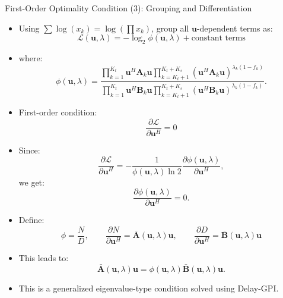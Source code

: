 \documentclass{beamer}
\begin{document}
\begin{frame}{First-Order Optimality Condition (3): Grouping and Differentiation}
\small

\begin{itemize}
    \item Using $\sum \log(x_k)=\log\left(\prod x_k\right)$, group all $\mathbf{u}$-dependent terms as:
    \[
        \mathcal{L}(\mathbf{u},\lambda)
        =
        -\log_2 \phi(\mathbf{u},\lambda)
        +
        \text{constant terms}
    \]

    \item where:
    \[
        \phi(\mathbf{u},\lambda)
        =
        \frac{
        \prod_{k=1}^{K_t}
        \mathbf{u}^H\mathbf{A}_k\mathbf{u}
        \prod_{k=K_t+1}^{K_t+K_s}
        (\mathbf{u}^H\mathbf{A}_k\mathbf{u})^{\lambda_k(1-f_k)}
        }
        {
        \prod_{k=1}^{K_t}
        \mathbf{u}^H\mathbf{B}_k\mathbf{u}
        \prod_{k=K_t+1}^{K_t+K_s}
        (\mathbf{u}^H\mathbf{B}_k\mathbf{u})^{\lambda_k(1-f_k)}
        } .
    \]

    \item First-order condition:
    \[
        \frac{\partial \mathcal{L}}{\partial \mathbf{u}^H}=0
    \]

    \item Since:
    \[
        \frac{\partial \mathcal{L}}{\partial \mathbf{u}^H}
        =
        -
        \frac{1}{\phi(\mathbf{u},\lambda)\ln 2}
        \frac{\partial \phi(\mathbf{u},\lambda)}
        {\partial \mathbf{u}^H},
    \]
    we get:
    \[
        \frac{\partial \phi(\mathbf{u},\lambda)}
        {\partial \mathbf{u}^H}=0 .
    \]

\end{itemize}
\end{frame}

\begin{frame}{}
\begin{itemize}
    \item Define:
    \[
        \phi = \frac{N}{D},
        \qquad
        \frac{\partial N}{\partial \mathbf{u}^H}
        =
        \bar{\mathbf{A}}(\mathbf{u},\lambda)\mathbf{u},
        \qquad
        \frac{\partial D}{\partial \mathbf{u}^H}
        =
        \bar{\mathbf{B}}(\mathbf{u},\lambda)\mathbf{u}
    \]
    \item This leads to:
    \[
        \bar{\mathbf{A}}(\mathbf{u},\lambda)\mathbf{u}
        =
        \phi(\mathbf{u},\lambda)
        \bar{\mathbf{B}}(\mathbf{u},\lambda)\mathbf{u}.
    \]

    \item This is a generalized eigenvalue-type condition solved using Delay-GPI.
\end{itemize}

\end{frame}
\end{document}
